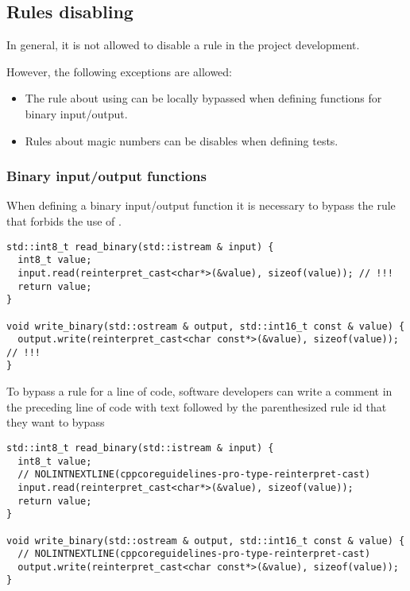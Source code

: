 \subsection{Rules disabling}

In general, it is not allowed to disable a rule in the project development. 

However, the following exceptions are allowed:

\begin{itemize}

\item The rule about using  can be locally bypassed
      when defining functions for binary input/output.

\item Rules about magic numbers can be disables when defining tests.

\end{itemize}

\subsubsection{Binary input/output functions}

When defining a binary input/output function it is necessary to bypass the rule
that forbids the use of .

\begin{lstlisting}
std::int8_t read_binary(std::istream & input) {
  int8_t value;
  input.read(reinterpret_cast<char*>(&value), sizeof(value)); // !!!
  return value;
}

void write_binary(std::ostream & output, std::int16_t const & value) {
  output.write(reinterpret_cast<char const*>(&value), sizeof(value)); // !!!
}
\end{lstlisting} 

To bypass a rule for a line of code, software developers can write a comment in
the preceding line of code with text  followed by the 
parenthesized rule id that they want to bypass

\begin{lstlisting}
std::int8_t read_binary(std::istream & input) {
  int8_t value;
  // NOLINTNEXTLINE(cppcoreguidelines-pro-type-reinterpret-cast)
  input.read(reinterpret_cast<char*>(&value), sizeof(value));
  return value;
}

void write_binary(std::ostream & output, std::int16_t const & value) {
  // NOLINTNEXTLINE(cppcoreguidelines-pro-type-reinterpret-cast)
  output.write(reinterpret_cast<char const*>(&value), sizeof(value));
}
\end{lstlisting} 

